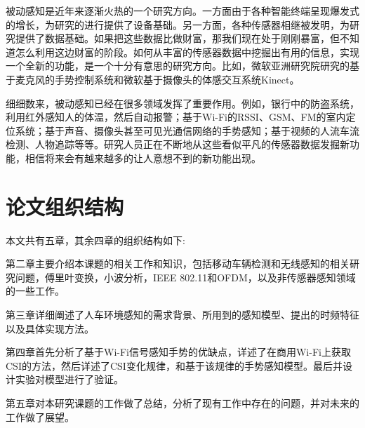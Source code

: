 被动感知是近年来逐渐火热的一个研究方向。一方面由于各种智能终端呈现爆发式的增长，为研究的进行提供了设备基础。另一方面，各种传感器相继被发明，为研究提供了数据基础。如果把这些数据比做财富，那我们现在处于刚刚暴富，但不知道怎么利用这边财富的阶段。如何从丰富的传感器数据中挖掘出有用的信息，实现一个全新的功能，是一个十分有意思的研究方向。比如，微软亚洲研究院研究的基于麦克风的手势控制系统和微软基于摄像头的体感交互系统Kinect。

细细数来，被动感知已经在很多领域发挥了重要作用。例如，银行中的防盗系统，利用红外感知人的体温，然后自动报警；基于Wi-Fi的RSSI、GSM、FM的室内定位系统；基于声音、摄像头甚至可见光通信网络的手势感知；基于视频的人流车流检测、人物追踪等等。研究人员正在不断地从这些看似平凡的传感器数据发掘新功能，相信将来会有越来越多的让人意想不到的新功能出现。 


\section{论文组织结构}

本文共有五章，其余四章的组织结构如下:

第二章主要介绍本课题的相关工作和知识，包括移动车辆检测和无线感知的相关研究问题，傅里叶变换，小波分析，IEEE 802.11和OFDM，以及非传感器感知领域的一些工作。

第三章详细阐述了人车环境感知的需求背景、所用到的感知模型、提出的时频特征以及具体实现方法。

第四章首先分析了基于Wi-Fi信号感知手势的优缺点，详述了在商用Wi-Fi上获取CSI的方法，然后详述了CSI变化规律，和基于该规律的手势感知模型。最后并设计实验对模型进行了验证。

第五章对本研究课题的工作做了总结，分析了现有工作中存在的问题，并对未来的工作做了展望。







